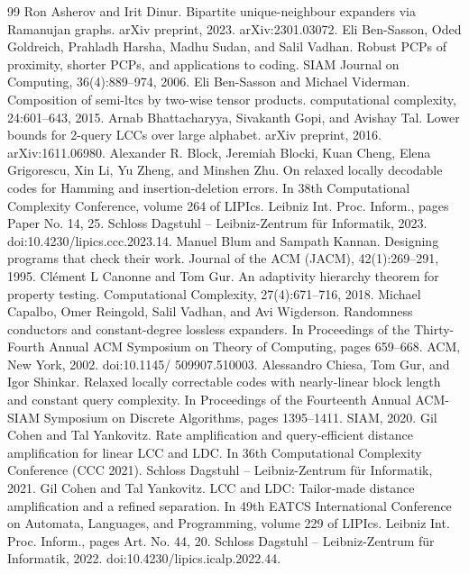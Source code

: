 \documentclass[10pt,a4paper]{article}
\begin{document}
\begin{thebibliography}{99}
 Ron Asherov and Irit Dinur. Bipartite unique-neighbour expanders via Ramanujan graphs. arXiv preprint, 2023. arXiv:2301.03072.
 Eli Ben-Sasson, Oded Goldreich, Prahladh Harsha, Madhu Sudan, and Salil Vadhan. Robust PCPs of proximity, shorter PCPs, and applications to coding. SIAM Journal on Computing, 36(4):889–974, 2006.
 Eli Ben-Sasson and Michael Viderman. Composition of semi-ltcs by two-wise tensor products. computational complexity, 24:601–643, 2015.
 Arnab Bhattacharyya, Sivakanth Gopi, and Avishay Tal. Lower bounds for 2-query LCCs over large alphabet. arXiv preprint, 2016. arXiv:1611.06980.
 Alexander R. Block, Jeremiah Blocki, Kuan Cheng, Elena Grigorescu, Xin Li, Yu Zheng, and Minshen Zhu. On relaxed locally decodable codes for Hamming and insertion-deletion errors. In 38th Computational Complexity Conference, volume 264 of LIPIcs. Leibniz Int. Proc. Inform., pages Paper No. 14, 25. Schloss Dagstuhl – Leibniz-Zentrum für Informatik, 2023. doi:10.4230/lipics.ccc.2023.14.
 Manuel Blum and Sampath Kannan. Designing programs that check their work. Journal of the ACM (JACM), 42(1):269–291, 1995.
 Clément L Canonne and Tom Gur. An adaptivity hierarchy theorem for property testing. Computational Complexity, 27(4):671–716, 2018.
 Michael Capalbo, Omer Reingold, Salil Vadhan, and Avi Wigderson. Randomness conductors and constant-degree lossless expanders. In Proceedings of the Thirty-Fourth Annual ACM Symposium on Theory of Computing, pages 659–668. ACM, New York, 2002. doi:10.1145/ 509907.510003.
 Alessandro Chiesa, Tom Gur, and Igor Shinkar. Relaxed locally correctable codes with nearly-linear block length and constant query complexity. In Proceedings of the Fourteenth Annual ACM-SIAM Symposium on Discrete Algorithms, pages 1395–1411. SIAM, 2020.
 Gil Cohen and Tal Yankovitz. Rate amplification and query-efficient distance amplification for linear LCC and LDC. In 36th Computational Complexity Conference (CCC 2021). Schloss Dagstuhl – Leibniz-Zentrum für Informatik, 2021.
 Gil Cohen and Tal Yankovitz. LCC and LDC: Tailor-made distance amplification and a refined separation. In 49th EATCS International Conference on Automata, Languages, and Programming, volume 229 of LIPIcs. Leibniz Int. Proc. Inform., pages Art. No. 44, 20. Schloss Dagstuhl – Leibniz-Zentrum für Informatik, 2022. doi:10.4230/lipics.icalp.2022.44.

\end{thebibliography}
\end{document}
